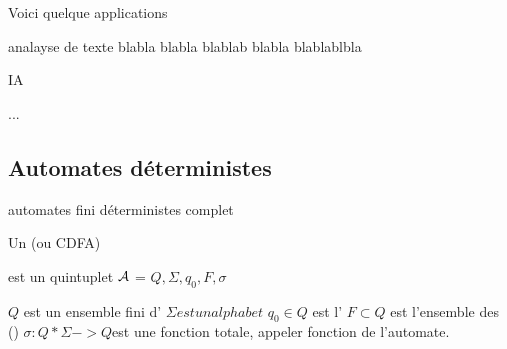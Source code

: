 \documentclass[a4paper,french,bookmarks]{book}
\begin{document}
    Voici quelque applications
    
    \begin{enumerate}
        \itt analayse de texte 
        \itt blabla  blabla 
        \itt blablab blabla 
        \itt blablablbla
        
        \itt IA 
        
        \itt ...
        
    \end{enumerate}
    
    \subsection{Automates déterministes}
    
    \begin{definition}{automates fini déterministes complet}{}
        
        Un  (ou CDFA) 
        
        est un quintuplet $\mathcal{A}$ = $Q,\Sigma, q_0, F, \sigma$
        \begin{enumerate}
            \itt $Q$ est un ensemble fini d'
            \itt $\Sigma est un alphabet$
            \itt $q_0 \in Q$ est l'
            \itt $F \subset Q$ est l'ensemble des  ()
            \itt $\sigma :  Q  *  \Sigma -> Q $est une fonction totale, appeler fonction de l'automate.   
        
        \end{enumerate}
    
    \end{definition}
    
\end{document}
